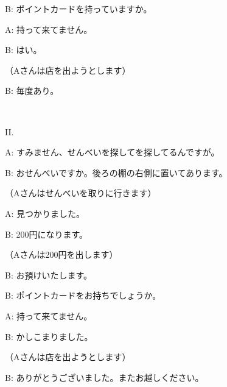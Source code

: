 	B: ポイントカードを持っていますか。

	A: 持って来てません。

	B: はい。

	（Aさんは店を出ようとします）

	B: 毎度あり。
	
	~
	
	II.
	
	A: すみません、せんべいを探してを探してるんですが。
	
	B: おせんべいですか。後ろの棚の右側に置いてあります。
	
	（Aさんはせんべいを取りに行きます）
	
	A: 見つかりました。
	
	B: 200円になります。
	
	（Aさんは200円を出します）
	
	B: お預けいたします。

	B: ポイントカードをお持ちでしょうか。

	A: 持って来てません。

	B: かしこまりました。

	（Aさんは店を出ようとします）

	B: ありがとうございました。またお越しください。
	
	
	
	
